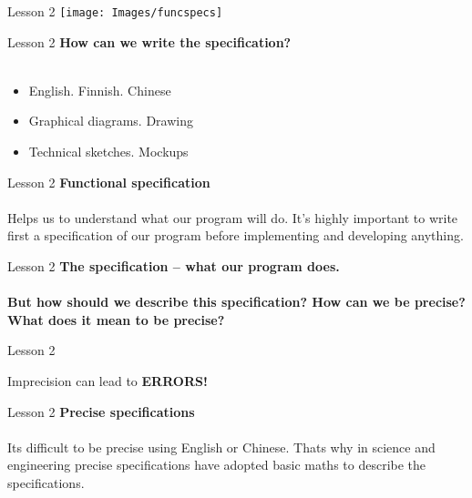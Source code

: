 \documentclass[aspectratio=1610]{beamer}
\begin{document}
\begin{frame}{Lesson 2}{}
\texttt{[image: Images/funcspecs]}
\end{frame}



\begin{frame}{Lesson 2}{}
\LARGE
\textbf{How can we write the specification?}\\~\\
\begin{itemize}
    \item English. Finnish. Chinese
    \item Graphical diagrams. Drawing
    \item Technical sketches. Mockups
\end{itemize}
\end{frame}


\begin{frame}{Lesson 2}{}
\LARGE
\textbf{Functional specification}\\~\\
Helps us to understand what our program will do. It’s highly important to write first a specification of our program \alert{before}  implementing and developing anything.
\end{frame}




\begin{frame}{Lesson 2}{}
\LARGE
    \textbf{The specification -- what our program does.}\\~\\
  
\textbf{But how should we describe this specification? How can we be precise? What does it mean to be precise?}
\end{frame}



\begin{frame}{Lesson 2}{}
\begin{center}
\Huge
	Imprecision can lead to \alert{\textbf{ERRORS!}}
\end{center}
\end{frame}


\begin{frame}{Lesson 2}{}
\LARGE
\textbf{Precise specifications}\\~\\
Its difficult to be precise using English or Chinese. Thats why in science and engineering precise specifications have adopted basic maths to describe the specifications.
\end{frame}
\end{document}
